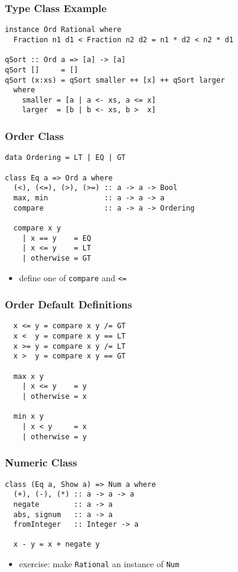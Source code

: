 \documentclass[dvipsnames]{beamer}
\theoremstyle{plain}
\begin{document}
\begin{frame}[fragile]
  \frametitle{Type Class Example}

  \begin{lstlisting}
instance Ord Rational where
  Fraction n1 d1 < Fraction n2 d2 = n1 * d2 < n2 * d1

qSort :: Ord a => [a] -> [a]
qSort []     = []
qSort (x:xs) = qSort smaller ++ [x] ++ qSort larger
  where
    smaller = [a | a <- xs, a <= x]
    larger  = [b | b <- xs, b >  x]
  \end{lstlisting}
\end{frame}

\begin{frame}[fragile]
  \frametitle{Order Class}

  \begin{lstlisting}
data Ordering = LT | EQ | GT

class Eq a => Ord a where
  (<), (<=), (>), (>=) :: a -> a -> Bool
  max, min             :: a -> a -> a
  compare              :: a -> a -> Ordering

  compare x y
    | x == y    = EQ
    | x <= y    = LT
    | otherwise = GT
  \end{lstlisting}

  \begin{itemize}
    \item define one of \lstinline|compare| and \lstinline|<=|
  \end{itemize}
\end{frame}

\begin{frame}[fragile]
  \frametitle{Order Default Definitions}

  \begin{lstlisting}
  x <= y = compare x y /= GT
  x <  y = compare x y == LT
  x >= y = compare x y /= LT
  x >  y = compare x y == GT

  max x y
    | x <= y    = y
    | otherwise = x

  min x y
    | x < y     = x
    | otherwise = y
  \end{lstlisting}
\end{frame}

\begin{frame}[fragile]
  \frametitle{Numeric Class}

  \begin{lstlisting}
class (Eq a, Show a) => Num a where
  (+), (-), (*) :: a -> a -> a
  negate        :: a -> a
  abs, signum   :: a -> a
  fromInteger   :: Integer -> a

  x - y = x + negate y
  \end{lstlisting}

  \begin{itemize}
    \item exercise: make \lstinline|Rational| an instance of
      \lstinline|Num|
  \end{itemize}
\end{frame}
\end{document}
